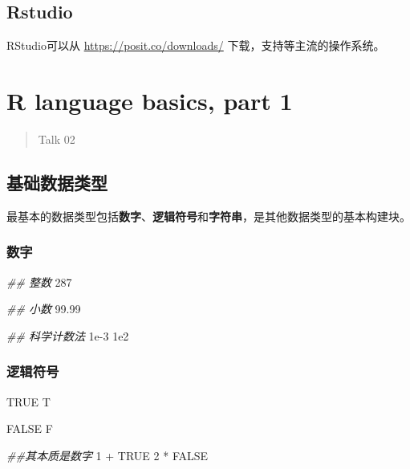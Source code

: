 \documentclass[
]{article}
\newenvironment{Shaded}{}{}
\newcommand{\ConstantTok}[1]{\textcolor[rgb]{0.53,0.00,0.00}{#1}}
\newcommand{\DecValTok}[1]{\textcolor[rgb]{0.25,0.63,0.44}{#1}}
\newcommand{\DocumentationTok}[1]{\textcolor[rgb]{0.73,0.13,0.13}{\textit{#1}}}
\newcommand{\FloatTok}[1]{\textcolor[rgb]{0.25,0.63,0.44}{#1}}
\newcommand{\NormalTok}[1]{#1}
\newcommand{\SpecialCharTok}[1]{\textcolor[rgb]{0.25,0.44,0.63}{#1}}
\begin{document}
\hypertarget{r-studio}{%
\subsection{Rstudio}\label{r-studio}}

RStudio可以从 \url{https://posit.co/downloads/}
下载，支持等主流的操作系统。

\newpage
\hypertarget{r-language-basics-part-1}{%
\section{R language basics, part 1}\label{r-language-basics-part-1}}

\begin{quote}
Talk 02
\end{quote}

\hypertarget{ux57faux7840ux6570ux636eux7c7bux578b}{%
\subsection{基础数据类型}\label{ux57faux7840ux6570ux636eux7c7bux578b}}

最基本的数据类型包括\textbf{数字}、\textbf{逻辑符号}和\textbf{字符串}，是其他数据类型的基本构建块。

\hypertarget{ux6570ux5b57}{%
\subsubsection{\texorpdfstring{数字 }{数字 }}\label{ux6570ux5b57}}

\begin{Shaded}
\begin{Highlighting}[]
\DocumentationTok{\#\# 整数}
\DecValTok{287}

\DocumentationTok{\#\# 小数}
\FloatTok{99.99}

\DocumentationTok{\#\# 科学计数法}
\FloatTok{1e{-}3}
\FloatTok{1e2}
\end{Highlighting}
\end{Shaded}

\hypertarget{ux903bux8f91ux7b26ux53f7}{%
\subsubsection{逻辑符号}\label{ux903bux8f91ux7b26ux53f7}}

\begin{Shaded}
\begin{Highlighting}[]
\ConstantTok{TRUE}
\NormalTok{T}

\ConstantTok{FALSE}
\NormalTok{F}

\DocumentationTok{\#\#其本质是数字}
\DecValTok{1} \SpecialCharTok{+} \ConstantTok{TRUE}
\DecValTok{2} \SpecialCharTok{*} \ConstantTok{FALSE}
\end{Highlighting}
\end{Shaded}
\end{document}
